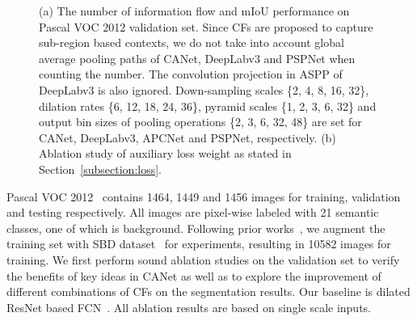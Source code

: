 \documentclass[journal]{IEEEtran}
\begin{document}
\begin{figure}[t]
    \centering
\caption{(a) The number of information flow and mIoU performance on Pascal VOC 2012 validation set. Since CFs are proposed to capture sub-region based contexts, we do not take into account global average pooling paths of CANet, DeepLabv3 and PSPNet when counting the number. The  convolution projection in ASPP of DeepLabv3 is also ignored. Down-sampling scales \{2, 4, 8, 16, 32\}, dilation rates \{6, 12, 18, 24, 36\}, pyramid scales \{1, 2, 3, 6, 32\} and output bin sizes of pooling operations \{2, 3, 6, 32, 48\} are set for CANet, DeepLabv3, APCNet and PSPNet, respectively. (b) Ablation study of auxiliary loss weight  as stated in Section~\ref{subsection:loss}.}
        \label{fig:comparisons}
\end{figure}

Pascal VOC 2012~\cite{everingham2010pascal} contains 1464, 1449 and 1456 images for training, validation and testing respectively. All images are pixel-wise labeled with 21 semantic classes, one of which is background. Following prior works~\cite{long2015fully,zhao2017pyramid,chen2014semantic}, we augment the training set with SBD dataset~\cite{hariharan2015hypercolumns} for experiments, resulting in 10582 images for training. We first perform sound ablation studies on the validation set to verify the benefits of key ideas in CANet as well as to explore the improvement of different combinations of CFs on the segmentation results. Our baseline is dilated ResNet based FCN~\cite{long2015fully,he2016deep,chen2017deeplab}. All ablation results are based on single scale inputs.
\end{document}
